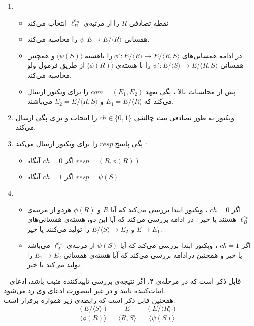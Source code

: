 \begin{enumerate}
	
\item {
\begin{itemize}
\item 
 نقطه تصادفی 
$R$
را از مرتبه‌ی
$\ell_B^{e_B}$
انتخاب می‌کند.
	
\item 
 همسانی
$\psi : E \rightarrow E / \langle R \rangle$
را محاسبه می‌کند.
\item 
در ادامه همسانی‌های
${\phi}' : E / \langle R \rangle \rightarrow  E / \langle R,S \rangle $
را باهسته
$\langle \psi(S) \rangle$
و همچنین همسانی
${\psi}' : E / \langle S \rangle \rightarrow  E / \langle R,S \rangle $
را با هسته‌ی
$\langle \phi(R) \rangle$
 از طریق فرمول ولو محاسبه می‌کند.
 \item 
 پس از محاسبات بالا ، پگی تعهد 
 $com = (E_1 , E_2)$
را برای ویکتور ارسال می‌کند که
 $E_1 = E / \langle R \rangle$
 و
 $E_2 = E / \langle R,S \rangle$
‌ می‌باشند.
 
\end{itemize}	
} %

\item 
ویکتور به طور تصادفی  بیت چالشی 
$ch \in \{0,1\}$
را انتحاب و برای پگی ارسال می‌کند.
\item 
پگی پاسخ 
$resp$
را برای ویکتور ارسال می‌کند :
\begin{itemize}
	\item
	اگر 
	$ch = 0$
	آنگاه
	$resp = (R,\phi(R))$
	
	\item
	اگر 
	$ch = 1$
	آنگاه
	$resp = \psi(S)$
	
\end{itemize}
\item {
\begin{itemize}
	\item 
	اگر
	$ch = 0 $
	، ویکتور ابتدا بررسی می‌کند که آیا
	$R$
	و
	$\phi(R)$
	هردو از مرتبه‌ی 
	$\ell_B^{e_B}$
	هستند یا خیر . در ادامه بررسی می‌کند که آیا این دو، هسته‌ی همسانی‌های
	$E \rightarrow E_1$
	و 
	$E/ \langle S \rangle \rightarrow E_2$
	را تولید می‌کنند یا خیر.
	\item 
	اگر 
	$ch = 1 $
	، ویکتور ابتدا بررسی می‌کند که آیا  
	$\psi(S)$
	از مرتبه‌ی
	$\ell_A^{e_A}$
	می‌باشد یا خیر و همچنین درادامه بررسی می‌کند که آیا هسته‌ی همسانی 
	$E_1 \rightarrow E_2$
	را تولید می‌کند یا خیر.
\end{itemize}
} %
\end{enumerate}~
\remark
قابل ذکر است که در مرحله‌ی ۴، اگر نتیجه‌ی بررسی تاییدکننده مثبت باشد، ادعای اثبات‌کننده تایید و در غیر اینصورت ادعای وی رد می‌شود.	
\\
\remark
همچنین قابل ذکر است که رابطه‌ی زیر همواره برقرار است:
$$
\frac{(E/\langle S \rangle)}{\langle \phi(R) \rangle} =
\frac{E}{\langle R,S \rangle}  = 
\frac{( E/ \langle R \rangle)}{\langle \psi(S) \rangle} 
$$


